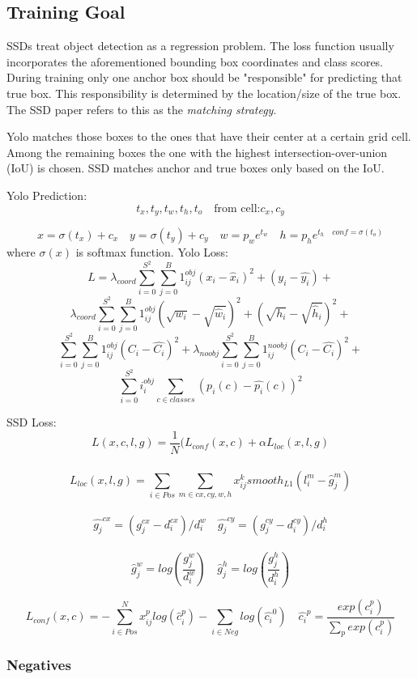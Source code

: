 \documentclass{article}
\begin{document}
	\subsection{Training Goal}
	SSDs treat object detection as a regression problem. The loss function usually incorporates the aforementioned bounding box coordinates and class scores. During training only one anchor box should be "responsible" for predicting that true box. This responsibility is determined by the location/size of the true box. The SSD paper refers to this as the \textit{matching strategy}.
	
	Yolo matches those boxes to the ones that have their center at a certain grid cell. Among the remaining boxes the one with the highest intersection-over-union (IoU) is chosen. SSD matches anchor and true boxes only based on the IoU.
	
	Yolo Prediction:
	$$t_x,t_y,t_w,t_h,t_o \quad \text{from cell:} c_x, c_y$$
	
	$$x = \sigma(t_x) + c_x \quad y = \sigma(t_y) + c_y \quad w = p_w e^{t_w} \quad h = p_he^{t_h \quad conf = \sigma(t_o)}$$
	where $\sigma(x)$ is softmax function.
	Yolo Loss:\\
	$$ L = \lambda_{coord} \sum_{i=0}^{S^2}\sum_{j=0}^{B} 1^{obj}_{ij}(x_i - \hat{x}_i)^2 + (y_i - \hat{y_i})+$$
	$$
	\lambda_{coord} \sum_{i=0}^{S^2}\sum_{j=0}^{B} 1^{obj}_{ij}(\sqrt{w_i} - \sqrt{\hat{w}_i})^2 + (\sqrt{h_i} - \sqrt{\hat{h}_i})^2 +$$ 
	$$\sum_{i=0}^{S^2}\sum_{j=0}^{B} 1^{obj}_{ij} (C_i - \hat{C_i})^2
	+ 
	\lambda_{noobj} \sum_{i=0}^{S^2}\sum_{j=0}^{B} 1^{noobj}_{ij} (C_i - \hat{C_i})^2
	+ $$$$
	\sum_{i=0}^{S^2}i_i^{obj} \sum_{c \in classes}(p_i(c) - \hat{p_i}(c))^2$$
	
	SSD Loss:\\
	$$L(x,c,l,g) = \frac{1}{N} (L_{conf}(x,c) +\alpha L_{loc}(x,l,g)$$\\
	$$L_{loc}(x,l,g) = \sum_{i \in Pos}\sum_{m \in {cx,cy,w,h}} x_{ij}^k smooth_{L1} (l_i^m - \hat{g}^m_j)$$\\
	$$\hat{g_j}^{cx} = (g_j^{cx} - d_i^{cx})/d_i^{w} \quad \hat{g_j}^{cy} = (g_j^{cy} - d_i^{cy})/d_i^{h}$$\\
	$$\hat{g}_j^w = log(\frac{g_j^w}{d_i^w}) \quad \hat{g}_j^h = log(\frac{g_j^h}{d_i^h})$$
	
	$$L_{conf}(x,c) = - \sum_{i \in Pos}^{N} x_{ij}^p log(\hat{c}_i^p) - \sum_{i \in Neg} log(\hat{c_i}^0) \quad \hat{c_i}^p = \frac{exp(c_i^p)}{\sum_{p} exp(c_i^p)}$$
	\subsubsection{Negatives}
	
\end{document}
